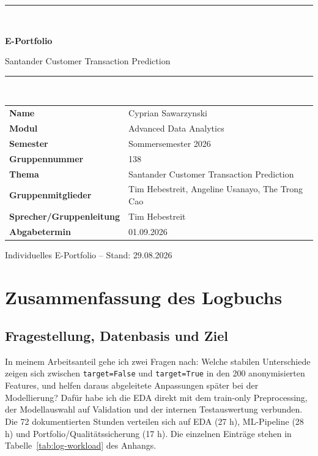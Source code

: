 \documentclass[10pt,a4paper]{article}
\begin{document}
\hypersetup{pageanchor=false}
\begin{titlepage}
  \centering
  \vspace*{1.8cm}
  {\color{ADAblue}\rule{\textwidth}{1.5pt}}\\[1.0cm]
  {\Huge\bfseries\color{ADAblue} E-Portfolio\par}
  \vspace{0.4cm}
  {\LARGE Santander Customer Transaction Prediction\par}
  \vspace{1.1cm}
  {\color{ADAgold}\rule{0.35\textwidth}{2pt}}\\[1.2cm]

  \begin{tabular}{>{\bfseries}p{}p{}}
    Name & Cyprian Sawarzynski \\
    Modul & Advanced Data Analytics \\
    Semester & Sommersemester 2026 \\
    Gruppennummer & 138 \\
    Thema & Santander Customer Transaction Prediction \\
    Gruppenmitglieder & Tim Hebestreit, Angeline Usanayo, The Trong Cao \\
    Sprecher/Gruppenleitung & Tim Hebestreit \\
    Abgabetermin & 01.09.2026 \\
  \end{tabular}

  \vfill
  {\small Individuelles E-Portfolio -- Stand: 29.08.2026\par}
\end{titlepage}
\hypersetup{pageanchor=true}

\tableofcontents
\clearpage

\section{Zusammenfassung des Logbuchs}
\label{sec:summary}

\subsection{Fragestellung, Datenbasis und Ziel}

In meinem Arbeitsanteil gehe ich zwei Fragen nach: Welche stabilen Unterschiede zeigen sich
zwischen \texttt{target=False} und \texttt{target=True} in den 200 anonymisierten Features,
und helfen daraus abgeleitete Anpassungen später bei der Modellierung? Dafür habe ich die
EDA direkt mit dem train-only Preprocessing, der Modellauswahl auf Validation und der
internen Testauswertung verbunden. Die 72 dokumentierten Stunden verteilen sich auf EDA
(27 h), ML-Pipeline (28 h) und Portfolio/Qualitätssicherung (17 h). Die einzelnen Einträge
stehen in Tabelle~\ref{tab:log-workload} des Anhangs.
\end{document}
